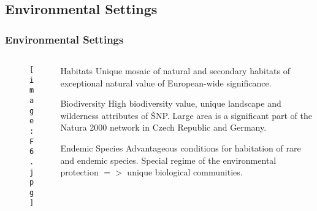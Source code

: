 \documentclass[pdflatex,compress,8pt,
	xcolor={dvipsnames,dvipsnames,svgnames,x11names,table},
	hyperref={
	breaklinks = true, 
	pdfauthor={Lemenkova Polina}, 
	pdfsubject={Preentation}, 
	pdfcreator={Lemenkova Polina}, 
	pdfproducer={Lemenkova Polina}, 
	colorlinks=true,linkcolor=blue, 
	citecolor=NavyBlue, 
	urlcolor = NavyBlue, 
	breaklinks = true}]{beamer}
\begin{document}
\subsection{Environmental Settings}
\begin{frame}\frametitle{Environmental Settings}

\begin{minipage}[0.4\textheight]{\textwidth}
\begin{columns}[T]
\begin{column}{0.5\textwidth}
\vspace{1em}
\begin{figure}[H]
	\centering
		\texttt{[image: F6.jpg]}
\end{figure}
\end{column}
\begin{column}{0.5\textwidth}
\vspace{2em} 

\begin{alertblock}{Habitats}
Unique mosaic of natural and secondary habitats of exceptional natural value of European-wide significance.
\end{alertblock}

\begin{block}{Biodiversity}
High biodiversity value, unique landscape and wilderness attributes of ŠNP. Large area is a significant part of the Natura 2000 network in Czech Republic and Germany.
\end{block}

\begin{examples}{Endemic Species}
Advantageous conditions for habitation of rare and endemic species. Special regime of the environmental protection $=>$ unique biological communities.
\end{examples}

\end{column}
\end{columns}
\end{minipage}
\end{frame}
\end{document}
